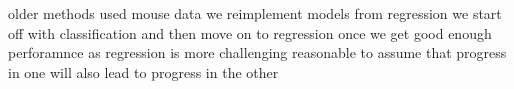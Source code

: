 


older methods used mouse data
we reimplement models from regression
we start off with classification and then move on to regression once we get good enough perforamnce as regression is more challenging
reasonable to assume that progress in one will also lead to progress in the other




